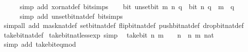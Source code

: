 \begin{isabellebody}
\ \ \ \ \isamarkupfalse%
\ {\isacharparenleft}{\kern0pt}simp\ add{\isacharcolon}{\kern0pt}\ xor{\isacharunderscore}{\kern0pt}nat{\isacharunderscore}{\kern0pt}def\ bit{\isacharunderscore}{\kern0pt}simps{\isacharparenright}{\kern0pt}\isanewline
\ \ \isamarkupfalse%
\ {\isacartoucheopen}bit\ {\isacharparenleft}{\kern0pt}unset{\isacharunderscore}{\kern0pt}bit\ m\ n{\isacharparenright}{\kern0pt}\ q\ {\isasymlongleftrightarrow}\ bit\ n\ q\ {\isasymand}\ m\ {\isasymnoteq}\ q{\isacartoucheclose}\isanewline
\ \ \ \ \isamarkupfalse%
\ {\isacharparenleft}{\kern0pt}simp\ add{\isacharcolon}{\kern0pt}\ unset{\isacharunderscore}{\kern0pt}bit{\isacharunderscore}{\kern0pt}nat{\isacharunderscore}{\kern0pt}def\ bit{\isacharunderscore}{\kern0pt}simps{\isacharparenright}{\kern0pt}\isanewline
{}\isamarkupfalse%
\ {\isacharparenleft}{\kern0pt}simp{\isacharunderscore}{\kern0pt}all\ add{\isacharcolon}{\kern0pt}\ mask{\isacharunderscore}{\kern0pt}nat{\isacharunderscore}{\kern0pt}def\ set{\isacharunderscore}{\kern0pt}bit{\isacharunderscore}{\kern0pt}nat{\isacharunderscore}{\kern0pt}def\ flip{\isacharunderscore}{\kern0pt}bit{\isacharunderscore}{\kern0pt}nat{\isacharunderscore}{\kern0pt}def\ push{\isacharunderscore}{\kern0pt}bit{\isacharunderscore}{\kern0pt}nat{\isacharunderscore}{\kern0pt}def\ drop{\isacharunderscore}{\kern0pt}bit{\isacharunderscore}{\kern0pt}nat{\isacharunderscore}{\kern0pt}def\ take{\isacharunderscore}{\kern0pt}bit{\isacharunderscore}{\kern0pt}nat{\isacharunderscore}{\kern0pt}def{\isacharparenright}{\kern0pt}%
\endisatagproof
{\isafoldproof}%
%
\isadelimproof
%
\endisadelimproof
\isanewline
\isanewline
{}\isamarkupfalse%
\isanewline
\isanewline
{}\isamarkupfalse%
\ take{\isacharunderscore}{\kern0pt}bit{\isacharunderscore}{\kern0pt}nat{\isacharunderscore}{\kern0pt}less{\isacharunderscore}{\kern0pt}exp\ {\isacharbrackleft}{\kern0pt}simp{\isacharbrackright}{\kern0pt}{\isacharcolon}{\kern0pt}\isanewline
\ \ {\isacartoucheopen}take{\isacharunderscore}{\kern0pt}bit\ n\ m\ {\isacharless}{\kern0pt}\ {}\ {\isacharcircum}{\kern0pt}\ n{\isacartoucheclose}\ \ n\ m\ {\isacharcolon}{\kern0pt}{\isacharcolon}{\kern0pt}nat\ \isanewline
%
\isadelimproof
\ \ %
\endisadelimproof
%
\isatagproof
{}\isamarkupfalse%
\ {\isacharparenleft}{\kern0pt}simp\ add{\isacharcolon}{\kern0pt}\ take{\isacharunderscore}{\kern0pt}bit{\isacharunderscore}{\kern0pt}eq{\isacharunderscore}{\kern0pt}mod{\isacharparenright}{\kern0pt}%
\endisatagproof
{\isafoldproof}%
%
\isadelimproof

\end{isabellebody}
